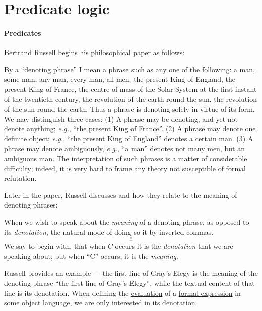 \section{Predicate logic}\label{sec:predicate_logic}

\paragraph{Predicates}

\begin{concept}\label{con:denotation}
  Bertrand Russell begins his philosophical paper \cite{Russell1905OnDenoting} as follows:
  \begin{displayquote}
    By a \enquote{denoting phrase} I mean a phrase such as any one of the following: a man, some man, any man, every man, all men, the present King of England, the present King of France, the centre of mass of the Solar System at the first instant of the twentieth century, the revolution of the earth round the sun, the revolution of the sun round the earth. Thus a phrase is denoting solely in virtue of its form. We may distinguish three cases: (1) A phrase may be denoting, and yet not denote anything; \textit{e.g.}, \enquote{the present King of France}. (2) A phrase may denote one definite object; \textit{e.g.}, \enquote{the present King of England} denotes a certain man. (3) A phrase may denote ambiguously, \textit{e.g.}, \enquote{a man} denotes not many men, but an ambiguous man. The interpretation of such phrases is a matter of considerable difficulty; indeed, it is very hard to frame any theory not susceptible of formal refutation.
  \end{displayquote}

  Later in the paper, Russell discusses  and how they relate to the meaning of denoting phrases:
  \begin{displayquote}
    When we wish to speak about the \textit{meaning} of a denoting phrase, as opposed to its \textit{denotation}, the natural mode of doing so it by inverted commas.
    \begin{equation*}
      \vdots
    \end{equation*}
    We say to begin with, that when \( C \) occurs it is the \textit{denotation} that we are speaking about; but when \enquote{C} occurs, it is the \textit{meaning}.
  \end{displayquote}

  Russell provides an example --- the first line of Gray's Elegy is the meaning of the denoting phrase \enquote{the first line of Gray's Elegy}, while the textual content of that line is its denotation. When defining the \hyperref[con:evaluation]{evaluation} of a \hyperref[con:expression]{formal expression} in some \hyperref[con:metalogic]{object language}, we are only interested in its denotation.
\end{concept}

